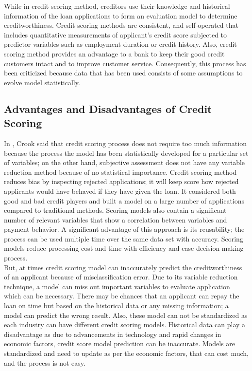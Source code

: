 {While in credit scoring method, creditors use their knowledge and historical information of the loan applications to form an evaluation model to determine creditworthiness. Credit scoring methods are consistent, and self-operated that includes quantitative measurements of applicant's credit score subjected to predictor variables such as employment duration or credit history. Also, credit scoring method provides an advantage to a bank to keep their good credit customers intact and to improve customer service. Consequently, this process has been criticized because data that has been used consists of some assumptions to evolve model statistically.\\
\subsection{Advantages and Disadvantages of Credit Scoring}
In \citep{crook1996credit}, Crook said that credit scoring process does not require too much information because the process the model has been statistically developed for a particular set of variables; on the other hand, subjective assessment does not have any variable reduction method because of no statistical importance. Credit scoring method reduces bias by inspecting rejected applications; it will keep score how rejected applicants would have behaved if they have given the loan. It considered both good and bad credit players and built a model on a large number of applications compared to traditional methods. Scoring models also contain a significant number of relevant variables that show a correlation between variables and payment behavior. A significant advantage of this approach is its reusability; the process can be used multiple time over the same data set with accuracy. Scoring models reduce processing cost and time with efficiency and ease decision-making process.\\

But, at times credit scoring model can inaccurately predict the creditworthiness of an applicant because of misclassification error. Due to its variable reduction technique, a model can miss out important variables to evaluate application which can be necessary. There may be chances that an applicant can repay the loan on time but based on the historical data or any missing information; a model can predict the wrong result. Also, these model can not be standardized as each industry can have different credit scoring models. Historical data can play a disadvantage as due to advancements in technology and rapid changes in economic factors, credit score model prediction can be inaccurate. Models are standardized and need to update as per the economic factors, that can cost much, and the process is not easy. 

}
